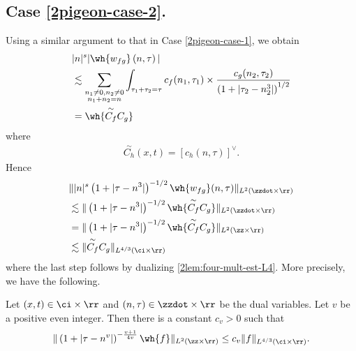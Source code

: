 \subsection{Case \eqref{2pigeon-case-2}.}
Using a similar argument to that in Case \eqref{2pigeon-case-1}, we obtain
%
%
\begin{equation}
	\label{21f}
	\begin{split}
		& |n|^s  | \wh{w_{fg}}\left( 
		n, \tau \right) |
		\\
		& \lesssim 
		\sum_{\substack{n_1 \neq0, n_2 \neq 0 \\n_1 + n_2 =n}} \int_{\tau_1 + \tau_2 = \tau}		c_f(n_1, \tau_1)
		\times
		\frac{c_g(n_2, \tau_2)}{\left( 1 + | \tau_2 - n_2^3 | 
		\right)^{1/2}} 
		\\
		& = \wh{\overset{\sim}{C_f} C_g}
	\end{split}
\end{equation}
%
where
%
%
\begin{equation*}
	\begin{split}
		\overset{\sim}{C_h}(x,t) = \left[ c_h(n, \tau) \right]^\vee.
	\end{split}
\end{equation*}
%
%
Hence
%
\begin{equation}
	\label{23f}
	\begin{split}
		& \| |n|^s \left( 1 + | \tau - n^3 | \right)^{-1/2} \wh{w_{fg}}(n, \tau) 
		\|_{L^2(\zzdot \times \rr)}
		\\
		& \lesssim \|\left( 1 + | \tau - n^{3} | \right)^{-1/2} 
		\wh{\overset{\sim}{C_f} C_g } \|_{L^2(\zzdot \times \rr)}
		\\
		& =  \|\left( 1 + | \tau - n^{3} | \right)^{-1/2} 
		\wh{\overset{\sim}{C_f} C_g } \|_{L^2(\zz \times \rr)}
		\\
		& \lesssim  \|\overset{\sim}{C_f} C_g  \|_{L^{4/3}(\ci \times \rr)}
	\end{split}
\end{equation}
%
where the last step follows by dualizing \cref{2lem:four-mult-est-L4}. More
precisely, we have the following.
\begin{corollary}
	\label{2cor:four-mult-est-L4}
	Let $(x, t) \in \ci \times \rr $ and $(n, \tau) \in \zzdot \times \rr$ be 
	the dual variables. Let $v$ be a positive even integer. Then there is a 
	constant $c_v > 0$ such that
%
%
\begin{equation}
	\label{2four-mult-est-L4st}
	\begin{split}
		\| \left( 1 + | \tau - n^v | 
		\right)^{-\frac{v+1}{4v}}
		\wh{f}\|_{L^2(\zz \times \rr)} \le c_v \|f \|_{L^{4/3}( \ci \times \rr)}.
	\end{split}
\end{equation}
%
%
\end{corollary}
